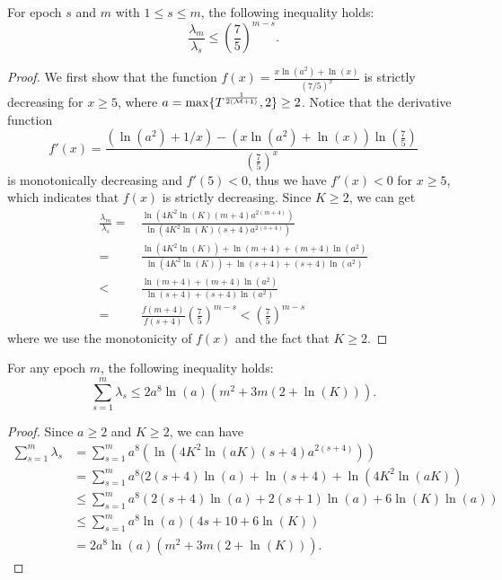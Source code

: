 \begin{lemma}
\label{lem:bb-trl}    %
    For epoch $s$ and $m$ with $1\le s \leq m$, the following inequality holds:
    \[\frac{\lambda_m}{\lambda_s} \leq \left(\frac{7}{5}\right)^{m-s}.\]
\end{lemma}
\begin{proof}
    We first show that the function $f(x)=\frac{x\ln(a^2)+\ln(x)}{(7/5)^x}$
    is strictly decreasing for $x\ge 5$, where $a = \max \{T^{\frac{1}{2({\mathcal{M}} + 1)}}, 2\} \ge 2$.
    Notice that the derivative function \[f'(x)=\frac{(\ln(a^2)+1/x)-(x\ln(a^2)+\ln(x))\ln\left(\frac{7}{5}\right)}{\left(\frac{7}{5}\right)^{x}}\]
    is monotonically decreasing and $f'(5)<0$, thus we have $f'(x)<0$ for $x\ge 5$, which indicates that $f(x)$ is strictly decreasing.
    Since $K\ge 2$, we can get
    \begin{align*}
    \frac{\lambda_m}{\lambda_s}=&\, \frac{\ln(4K^2\ln(K)(m+4)a^{2(m+4)})}{\ln(4K^2\ln(K)(s+4)a^{2(s+4)})}\\
    =& \,\frac{\ln(4K^2\ln(K))+\ln(m+4)+(m+4)\ln(a^2)}{\ln(4K^2\ln(K))+\ln(s+4)+(s+4)\ln(a^2)}\\
    <& \,\frac{\ln(m+4)+(m+4)\ln(a^2)}{\ln(s+4)+(s+4)\ln(a^2)}\\
    =&\,\frac{f(m+4)}{f(s+4)}\left(\frac{7}{5}\right)^{m-s}<\left(\frac{7}{5}\right)^{m-s}
    \end{align*}
where we use the monotonicity of $f(x)$ and the fact that $K\ge 2$.
\end{proof}

\begin{lemma}
\label{lem:bb-tsl}     %
    For any epoch $m$, the following inequality holds:
    \[\sum_{s=1}^{m} \lambda_s \leq 2a^8\ln(a)(m^2 + 3m(2 + \ln(K))).\]
\end{lemma}
\begin{proof}
    Since $a \ge 2$ and $K \geq 2$, we can have
    \begin{align*}
        \sum_{s=1}^{m} \lambda_s &= \sum_{s=1}^{m} a^8(\ln(4K^2\ln(aK)(s+4)a^{2(s+4)})) \\
        &= \sum_{s=1}^{m} a^8(2(s+4)\ln(a) + \ln(s+4) + \ln(4K^2\ln(aK)) \\
        &\leq \sum_{s=1}^{m} a^8(2(s+4)\ln(a) + 2(s+1)\ln(a) + 6\ln(K)\ln(a)) \\
        &\leq \sum_{s=1}^{m} a^8\ln(a)(4s + 10 + 6\ln(K)) \\
        &= 2a^8\ln(a)(m^2 + 3m(2 + \ln(K))).
    \end{align*}
\end{proof}

